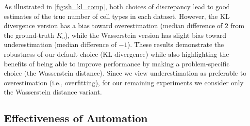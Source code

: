 %
As illustrated in \cref{fig:sh_kl_comp}, both choices of discrepancy lead to good estimates of the true number of cell types
in each dataset.
However, the KL divergence version has a bias toward overestimation (median difference of $2$ from the ground-truth $K_o$),
while the Wasserstein version has slight bias toward underestimation (median difference of $-1$).
These results demonstrate the robustness of our default choice (KL divergence) while also highlighting the benefits of being able to improve performance by making a problem-specific choice (the Wasserstein distance).
Since we view underestimation as preferable to overestimation (i.e., overfitting),
for our remaining experiments we consider only the Wasserstein distance variant.



\subsection{Effectiveness of Automation}

